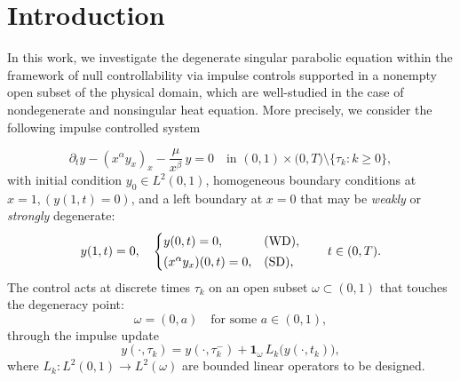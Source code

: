 \documentclass[sn-mathphys]{sn-jnl}
\newcommand{\WD}{\textup{(WD)}} %
\newcommand{\SD}{\textup{(SD)}} %
\begin{document}
\section{Introduction}\label{sec1}
In this work, we investigate the degenerate singular parabolic equation within the framework of null controllability via impulse controls supported in a nonempty open subset of the physical
domain, which are well-studied in the case of nondegenerate and nonsingular heat equation. More precisely, we consider the following impulse controlled system

\begin{equation}\label{1.1}
\partial_t y - (x^{\alpha} y_x)_x - \frac{\mu}{x^{\beta}}\,y = 0
\quad \text{in } (0,1)\times\bigl(0,T\bigr)\setminus\{\tau_k:k\ge0\},
\end{equation}
with initial condition $y_0 \in L^2(0,1)$, homogeneous boundary conditions at $x=1, (y(1, t)=0)$, and a left boundary at $x=0$ that may be
\emph{weakly} or \emph{strongly} degenerate:
\[
y(1,t)=0,\quad
\begin{cases}
y(0,t)=0, & \WD,\\[2pt]
(x^{\alpha} y_x)(0,t)=0, & \SD,
\end{cases}
\qquad t\in(0,T).
\]
The control acts at discrete times $\tau_k$ on an open subset $\omega\subset(0,1)$ that touches
the degeneracy point:
\begin{equation}\label{cond}
\omega=(0,a)\quad\text{for some } a\in(0,1),
\end{equation}
through the impulse update
\begin{equation*}
y(\cdot,\tau_k)=y(\cdot,\tau_k^-)+\mathbf{1}_\omega\,L_k\bigl(y(\cdot,t_k)\bigr),
\end{equation*}
where $L_k:L^2(0,1)\to L^2(\omega)$ are bounded linear operators to be designed.
\end{document}
